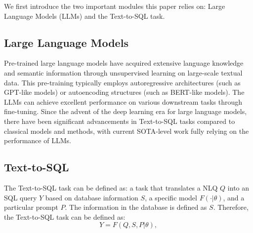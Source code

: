 
We first introduce the two important modules this paper relies on: Large Language Models (LLMs) and the Text-to-SQL task.
\subsection{Large Language Models} 

Pre-trained large language models have acquired extensive language knowledge and semantic information through unsupervised learning on large-scale textual data. This pre-training typically employs autoregressive architectures (such as GPT-like models) or autoencoding structures (such as BERT-like models). The LLMs can achieve excellent performance on various downstream tasks through fine-tuning. Since the advent of the deep learning era for large language models, there have been significant advancements in Text-to-SQL tasks compared to classical models and methods, with current SOTA-level work fully relying on the performance of LLMs.

\subsection{Text-to-SQL}
The Text-to-SQL task can be defined as: a task that translates a NLQ $\mathit{Q}$ into an SQL query $\mathit{Y}$ based on database information $\mathit{S}$, a specific model $F(\cdot | \theta)$, and a particular prompt $\mathit{P}$. The information in the database is defined as $\mathit{S}$. Therefore, the Text-to-SQL task can be defined as: 
\begin{equation}
\mathit{Y}=F(\mathit{Q},\mathit{S},\mathit{P} | \theta),
\end{equation}


